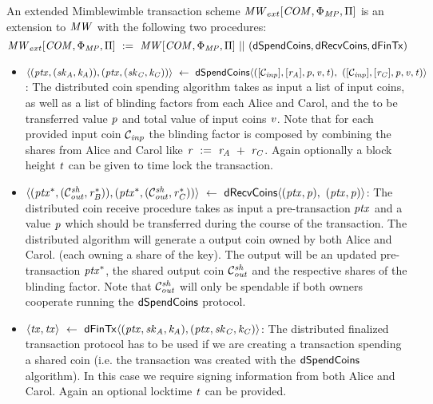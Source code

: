 \begin{definition}
    \label{def:atom:ext-mw-tx-scheme}
    An extended Mimblewimble transaction scheme $\mathit{MW}_{ext}[\mathit{COM},\Phi_{\mathit{MP}},\Pi]$ is an extension to $\mathit{MW}$ with the following two procedures:
    \[ \mathit{MW}_{ext}[\mathit{COM},\Phi_{\mathit{MP}},\Pi] ~:=~ \mathit{MW}[\mathit{COM},\Phi_{\mathit{MP}},\Pi] ~||~ (\mathsf{dSpendCoins}, \mathsf{dRecvCoins}, \mathsf{dFinTx}) \]
    \begin{itemize}
        \item $\langle (\mathit{ptx},(\mathit{sk}_{\mathit{A}},\mathit{\mathit{k}_{\mathit{A}}})), (\mathit{ptx},(\mathit{sk}_{\mathit{C}},\mathit{\mathit{k}_{\mathit{C}}})) \rangle \\
        ~\leftarrow~ \mathsf{dSpendCoins} \langle ([\mathcal{C}_{\mathit{inp}}],[\mathit{r}_{\mathit{A}}],\mathit{p},\mathit{v},\mathit{t}) ,~ ([\mathcal{C}_{\mathit{inp}}],[\mathit{r}_{\mathit{C}}],\mathit{p},\mathit{v},\mathit{t}) \rangle$:
        The distributed coin spending algorithm takes as input a list of input coins, as well as a list of blinding factors from each Alice and Carol, and the to be transferred value $\mathit{p}$ and total value of input coins $\mathit{v}$.
        Note that for each provided input coin $\mathcal{C}_{\mathit{inp}}$ the blinding factor is composed by combining the shares from Alice and Carol like
        $\mathit{r} ~:=~ \mathit{r}_{\mathit{A}} ~+~ \mathit{r}_{\mathit{C}}$.
        Again optionally a block height $\mathit{t}$ can be given to time lock the transaction.
        \item $\langle (\mathit{ptx}^*, (\mathcal{C}_{\mathit{out}}^{\mathit{sh}}, \mathit{r}_{\mathit{B}}^*)), (\mathit{ptx}^*, (\mathcal{C}_{\mathit{out}}^{\mathit{sh}}, \mathit{r}_{\mathit{C}}^*)) \rangle ~\leftarrow~ \mathsf{dRecvCoins} \langle(\mathit{ptx},\mathit{p}) ,~ (\mathit{ptx},\mathit{p}) \rangle$: The distributed coin receive procedure takes as input a pre-transaction $\mathit{ptx}$ and a value $\mathit{p}$ which should be transferred during the course of the transaction.
        The distributed algorithm will generate a output coin owned by both Alice and Carol. (each owning a share of the key).
        The output will be an updated pre-transaction $\mathit{ptx}^*$, the shared output coin $\mathcal{C}_{\mathit{out}}^{\mathit{sh}}$ and the respective shares of the blinding factor.
        Note that $\mathcal{C}_{\mathit{out}}^{\mathit{sh}}$ will only be spendable if both owners cooperate running the $\mathsf{dSpendCoins}$ protocol.
        \item $\langle \mathit{tx}, \mathit{tx} \rangle ~\leftarrow~ \mathsf{dFinTx} \langle(\mathit{ptx},\mathit{sk}_{\mathit{A}},\mathit{\mathit{k}_{\mathit{A}}}),(\mathit{ptx},\mathit{sk}_{\mathit{C}},\mathit{\mathit{k}_{\mathit{C}}})\rangle$: The distributed finalized transaction protocol has to be used if we are creating a transaction spending a shared coin (i.e. the transaction was created with the $\mathsf{dSpendCoins}$ algorithm).
        In this case we require signing information from both Alice and Carol.
        Again an optional locktime $\mathit{t}$ can be provided.
    \end{itemize}
\end{definition}

